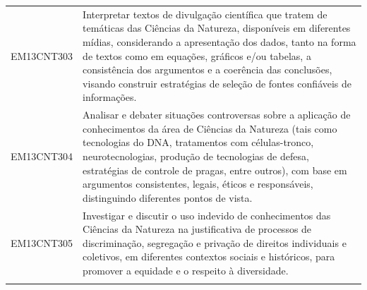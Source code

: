\documentclass[12pt]{extarticle}
\begin{document}
\begin{longtable}{ll}
EM13CNT303 & Interpretar textos de divulgação científica que tratem de temáticas das Ciências da Natureza, disponíveis em diferentes mídias, considerando a apresentação dos dados, tanto na forma de textos como em equações, gráficos e/ou tabelas, a consistência dos argumentos e a coerência das conclusões, visando construir estratégias de seleção de fontes confiáveis de informações.                                                                                                                                                                                                                                                                                                                                                                                                                                    \\
\rowcolor[HTML]{E0F7FA} 
EM13CNT304 & Analisar e debater situações controversas sobre a aplicação de conhecimentos da área de Ciências da Natureza (tais como tecnologias do DNA, tratamentos com células-tronco, neurotecnologias, produção de tecnologias de defesa, estratégias de controle de pragas, entre outros), com base em argumentos consistentes, legais, éticos e responsáveis, distinguindo diferentes pontos de vista.                                                                                                                                                                                                                                                                                                                                                                                                                       \\
\rowcolor[HTML]{FFF} 
EM13CNT305 & Investigar e discutir o uso indevido de conhecimentos das Ciências da Natureza na justificativa de processos de discriminação, segregação e privação de direitos individuais e coletivos, em diferentes contextos sociais e históricos, para promover a equidade e o respeito à diversidade.                                                                                                                                                                                                                                                                                                                                                                                                                                                                                                                          \\
\rowcolor[HTML]{E0F7FA} 

\end{longtable}
\end{document}
